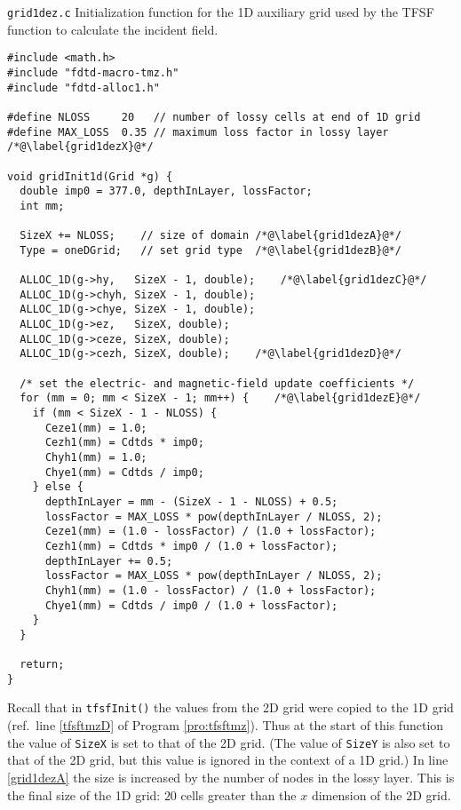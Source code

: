 \begin{program}
{\tt grid1dez.c}
Initialization function for the 1D auxiliary grid used by the TFSF
function to calculate the incident field.
\label{pro:grid1dez}
\codemiddle
\begin{lstlisting}
#include <math.h>
#include "fdtd-macro-tmz.h"
#include "fdtd-alloc1.h"

#define NLOSS     20   // number of lossy cells at end of 1D grid
#define MAX_LOSS  0.35 // maximum loss factor in lossy layer /*@\label{grid1dezX}@*/

void gridInit1d(Grid *g) {
  double imp0 = 377.0, depthInLayer, lossFactor;
  int mm;

  SizeX += NLOSS;    // size of domain /*@\label{grid1dezA}@*/
  Type = oneDGrid;   // set grid type  /*@\label{grid1dezB}@*/

  ALLOC_1D(g->hy,   SizeX - 1, double);    /*@\label{grid1dezC}@*/
  ALLOC_1D(g->chyh, SizeX - 1, double);
  ALLOC_1D(g->chye, SizeX - 1, double);
  ALLOC_1D(g->ez,   SizeX, double);
  ALLOC_1D(g->ceze, SizeX, double);
  ALLOC_1D(g->cezh, SizeX, double);    /*@\label{grid1dezD}@*/
  
  /* set the electric- and magnetic-field update coefficients */
  for (mm = 0; mm < SizeX - 1; mm++) {    /*@\label{grid1dezE}@*/
    if (mm < SizeX - 1 - NLOSS) {
      Ceze1(mm) = 1.0;
      Cezh1(mm) = Cdtds * imp0;
      Chyh1(mm) = 1.0;
      Chye1(mm) = Cdtds / imp0;
    } else {
      depthInLayer = mm - (SizeX - 1 - NLOSS) + 0.5;
      lossFactor = MAX_LOSS * pow(depthInLayer / NLOSS, 2);
      Ceze1(mm) = (1.0 - lossFactor) / (1.0 + lossFactor);
      Cezh1(mm) = Cdtds * imp0 / (1.0 + lossFactor);
      depthInLayer += 0.5;
      lossFactor = MAX_LOSS * pow(depthInLayer / NLOSS, 2);
      Chyh1(mm) = (1.0 - lossFactor) / (1.0 + lossFactor);
      Chye1(mm) = Cdtds / imp0 / (1.0 + lossFactor);
    }
  }

  return;
}
\end{lstlisting}
\end{program}

Recall that in {\tt tfsfInit()} the values from the 2D grid were
copied to the 1D grid (ref.\ line \ref{tfsftmzD} of Program
\ref{pro:tfsftmz}).  Thus at the start of this function the value of
{\tt SizeX} is set to that of the 2D grid.  (The value of {\tt SizeY}
is also set to that of the 2D grid, but this value is ignored in the
context of a 1D grid.)  In line \ref{grid1dezA} the size is increased by
the number of nodes in the lossy layer.  This is the final size of the
1D grid: $20$ cells greater than the $x$ dimension of the 2D grid.

